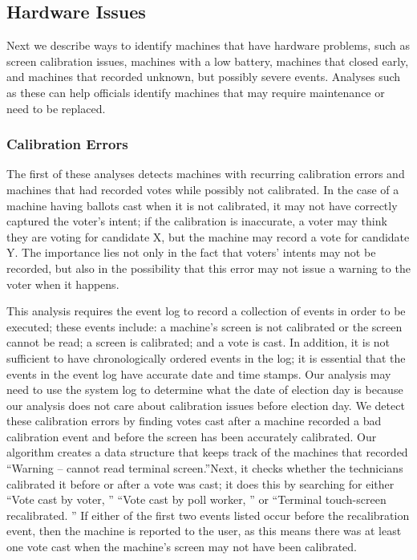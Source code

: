 \subsection{Hardware Issues}
Next we describe ways to identify machines that have hardware problems, such as screen calibration issues, machines with a low battery, machines that closed early, and machines that recorded unknown, but possibly severe events.  Analyses such as these can help officials identify machines that may require maintenance or need to be replaced.  

\subsubsection{Calibration Errors}
The first of these analyses detects machines with recurring calibration errors and machines that had recorded votes while possibly not calibrated.  In the case of a machine having ballots cast when it is not calibrated, it may not have correctly captured the voter's intent; if the calibration is inaccurate, a voter may think they are voting for candidate X, but the machine may record a vote for candidate Y.  The importance lies not only in the fact that voters' intents may not be recorded, but also in the possibility that this error may not issue a warning to the voter when it happens.    

This analysis requires the event log to record a collection of events in order to be executed; these events include: a machine's screen is not calibrated or the screen cannot be read; a screen is calibrated; and a vote is cast.  In addition, it is not sufficient to have chronologically ordered events in the log; it is essential that the events in the event log have accurate date and time stamps. Our analysis may need to use the system log to determine what the date of election day is because our analysis does not care about calibration issues before election day.  We detect these calibration errors by finding votes cast after a machine recorded a bad calibration event and before the screen has been accurately calibrated.  Our algorithm creates a data structure that keeps track of the machines that recorded \textquotedblleft Warning – cannot read terminal screen.\textquotedblright \hspace{2 mm}Next, it checks whether the technicians calibrated it before or after a vote was cast; it does this by searching for either \textquotedblleft Vote cast by voter, \textquotedblright \hspace{1 mm} \textquotedblleft Vote cast by poll worker, \textquotedblright \hspace{1 mm} or \textquotedblleft Terminal touch-screen recalibrated. \textquotedblright \hspace{2 mm} If either of the first two events listed occur before the recalibration event, then the machine is reported to the user, as this means there was at least one vote cast when the machine's screen may not have been calibrated.  

